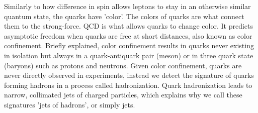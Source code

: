 Similarly to how difference in spin allows leptons to stay in an otherwise similar quantum state, the quarks have 'color'.
The colors of quarks are what connect them to the strong-force. \ac{QCD} is what allows quarks to change color. 
It predicts asymptotic freedom when quarks are free at short distances, also known as
color confinement. Briefly explained, color confinement results in quarks never existing
in isolation but always in a quark-antiquark pair (meson) or in three quark state (baryons) such as protons and neutrons. Given 
color confinement, quarks are never directly observed in experiments, instead we detect the signature of quarks forming hadrons in a 
process called hadronization. Quark hadronization leads to narrow, collimated jets of charged particles, which explains why we call 
these signatures 'jets of hadrons', or simply jets. 
